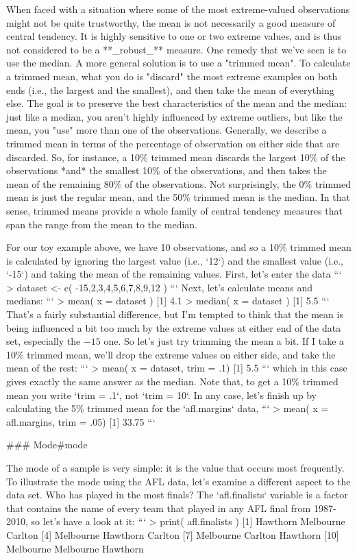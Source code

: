 When faced with a situation where some of the most extreme-valued observations might not be quite trustworthy, the mean is not necessarily a good measure of central tendency. It is highly sensitive to one or two extreme values, and is thus not considered to be a **_robust_** measure. One remedy that we've seen is to use the median. A more general solution is to use a "trimmed mean".  To calculate a trimmed mean, what you do is "discard" the most extreme examples on both ends (i.e., the largest and the smallest), and then take the mean of everything else. The goal is to preserve the best characteristics of the mean and the median: just like a median, you aren't highly influenced by extreme outliers, but like the mean, you "use" more than one of the observations. Generally, we describe a trimmed mean in terms of the percentage of observation on either side that are discarded. So, for instance, a 10\% trimmed mean discards the largest 10\% of the observations *and* the smallest 10\% of the observations, and then takes the mean of the remaining 80\% of the observations. Not surprisingly, the 0\% trimmed mean is just the regular mean, and the 50\% trimmed mean is the median. In that sense, trimmed means provide a whole family of central tendency measures that span the range from the mean to the median.


For our toy example above, we have 10 observations, and so a 10\% trimmed mean is calculated by ignoring the largest value (i.e., `12`) and the smallest value (i.e., `-15`) and taking the mean of the remaining values. First, let's enter the data
```
> dataset <- c( -15,2,3,4,5,6,7,8,9,12 )
```
Next, let's calculate means and medians:
```
> mean( x = dataset )
[1] 4.1
> median( x = dataset )
[1] 5.5
```
That's a fairly substantial difference, but I'm tempted to think that the mean is being influenced a bit too much by the extreme values at either end of the data set, especially the $-15$ one. So let's just try trimming the mean a bit. If I take a 10\% trimmed mean, we'll drop the extreme values on either side, and take the mean of the rest: 
```
> mean( x = dataset, trim = .1)
[1] 5.5
```
which in this case gives exactly the same answer as the median. Note that, to get a 10\% trimmed mean you write `trim = .1`, not `trim = 10`. In any case, let's finish up by calculating the 5\% trimmed mean for the `afl.margins` data, 
```
> mean( x = afl.margins, trim = .05)  
[1] 33.75
```
 

  
### Mode{#mode}

The mode of a sample is very simple: it is the value that occurs most frequently. To illustrate the mode using the AFL data, let's examine a different aspect to the data set. Who has played in the most finals? The `afl.finalists` variable is a factor that contains the name of every team that played in any AFL final from 1987-2010, so let's have a look at it:
```
> print( afl.finalists )
  [1] Hawthorn         Melbourne        Carlton         
  [4] Melbourne        Hawthorn         Carlton         
  [7] Melbourne        Carlton          Hawthorn        
 [10] Melbourne        Melbourne        Hawthorn              

